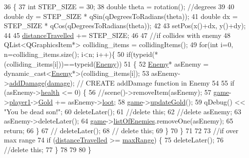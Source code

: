 \begin{DoxyCode}
36 \{
37     \textcolor{keywordtype}{int} STEP\_SIZE = 30;
38     \textcolor{keywordtype}{double} theta = rotation(); \textcolor{comment}{//degrees}
39 
40     \textcolor{keywordtype}{double} dy = STEP\_SIZE * qSin(qDegreesToRadians(theta));
41     \textcolor{keywordtype}{double} dx = STEP\_SIZE * qCos(qDegreesToRadians(theta));
42 
43     setPos(x()+dx, y()+dy);
44 
45     \hyperlink{class_bullet_afe194c1b7e495d0c17492396595202e1}{distanceTravelled} += STEP\_SIZE;
46 
47     \textcolor{comment}{//if collides with enemy}
48     QList<QGraphicsItem*> colliding\_items = collidingItems();
49         \textcolor{keywordflow}{for}(\textcolor{keywordtype}{int} i=0, n=colliding\_items.size(); i<n; i++)\{
50             \textcolor{keywordflow}{if}(\textcolor{keyword}{typeid}(*(colliding\_items[i]))==\textcolor{keyword}{typeid}(\hyperlink{class_enemy}{Enemy}))
51             \{
52              \hyperlink{class_enemy}{Enemy}* asEnemy = \textcolor{keyword}{dynamic\_cast<}\hyperlink{class_enemy}{Enemy}*\textcolor{keyword}{>}(colliding\_items[i]);
53              asEnemy->\hyperlink{class_enemy_ac7a5e3a071bcc4d67300cfae9446e0bd}{addDamage}(\hyperlink{class_bullet_a733d2ebbf9143c9ca68d3eb7e14121d0}{damage}); \textcolor{comment}{// CREATE addDamage function in Enemy}
54 
55              \textcolor{keywordflow}{if} (asEnemy->\hyperlink{class_enemy_aedd5e7bf8ef07ee97be433c853a10d8d}{health} <= 0) \{
56              \textcolor{comment}{//scene()->removeItem(asEnemy);}
57              \hyperlink{bullet_8cpp_a58bdb5643d0814ac4e697a1564b79b70}{game}->\hyperlink{class_game_ad8a7cc146f99c7ec5b7c3c25d73f118c}{player1}->\hyperlink{class_player1_ab390478b345e443398bac442a04b675c}{Gold} += asEnemy->\hyperlink{class_enemy_a8f007e72b954c077e5433a111def78c3}{loot};
58              \hyperlink{bullet_8cpp_a58bdb5643d0814ac4e697a1564b79b70}{game}->\hyperlink{class_game_a065998f7609f63e2987ede928359595a}{updateGold}();
59              qDebug() << \textcolor{stringliteral}{"You be dead son!"};
60              deleteLater();
61              \textcolor{comment}{//delete this;}
62              \textcolor{comment}{//delete asEnemy;}
63              asEnemy->deleteLater();
64              \hyperlink{bullet_8cpp_a58bdb5643d0814ac4e697a1564b79b70}{game}->\hyperlink{class_game_ab96914bfc1e59035233105abfb0787fe}{listOfEnemies}.removeOne(asEnemy);
65              \textcolor{keywordflow}{return};
66            \}
67 \textcolor{comment}{//             deleteLater();}
68 \textcolor{comment}{//             delete this;}
69         \}
70         \}
71 
72 
73     \textcolor{comment}{//if over max range}
74     \textcolor{keywordflow}{if} (\hyperlink{class_bullet_afe194c1b7e495d0c17492396595202e1}{distanceTravelled} >= \hyperlink{class_bullet_ae7c4fadfcc22643cb271622fe8bb2eb0}{maxRange}) \{
75         deleteLater();
76         \textcolor{comment}{//delete this;}
77     \}
78 
79 
80 \}
\end{DoxyCode}
\mbox{\label{class_bullet_ac1037d7a9f775b28bf1bc2727c018707}} 

